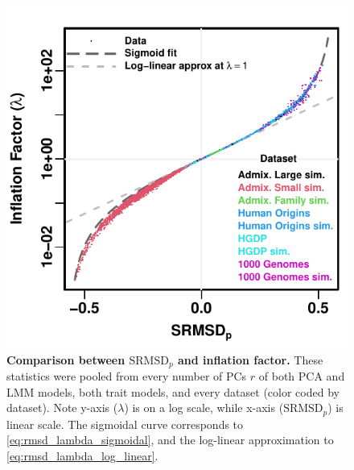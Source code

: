 \documentclass[11pt]{article}
\newcommand{\rmsd}{\text{SRMSD}_p}
\begin{document}
\begin{figure}[bp!]
  \centering
  \includegraphics{sum-rmsd-vs-lambda.pdf}
  \caption{
    {\bf Comparison between $\rmsd$ and inflation factor.}
    These statistics were pooled from every number of PCs $r$ of both PCA and LMM models, both trait models, and every dataset (color coded by dataset).
    Note y-axis ($\lambda$) is on a log scale, while x-axis ($\rmsd$) is linear scale.
    The sigmoidal curve corresponds to \cref{eq:rmsd_lambda_sigmoidal}, and the log-linear approximation to \cref{eq:rmsd_lambda_log_linear}.
  }
  \label{fig:rmsd_lambda}
\end{figure}
\end{document}
